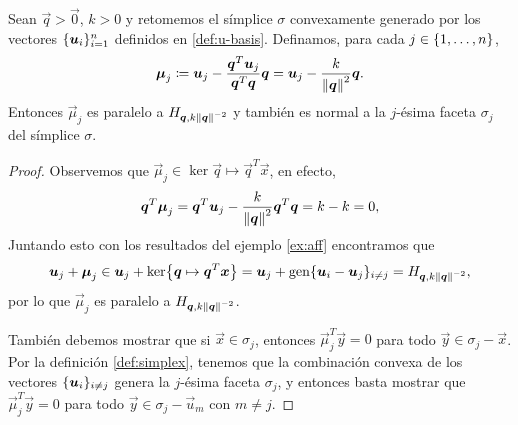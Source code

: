 \begin{lemma}
	\label{mu:orth}
	Sean $\vec{q} > \vec{0}$, $k > 0$ y retomemos el símplice $\sigma$ convexamente generado
	por los vectores $\lbrace \boldsymbol{u}_i \rbrace_{i=1}^{n}$ definidos en
	\eqref{def:u-basis}. Definamos, para cada $j \in \lbrace 1, \ldots, n \rbrace$,
	\begin{equation}
		\label{eq:normal}
		\boldsymbol{\mu}_j \coloneq \boldsymbol{u}_j - \frac{\boldsymbol{q}^T\boldsymbol{u}_j}{\boldsymbol{q}^T\boldsymbol{q}}\boldsymbol{q}
		= \boldsymbol{u}_j - \frac{k}{\left\lVert \boldsymbol{q} \right\rVert^2}\boldsymbol{q}.
	\end{equation}
	Entonces $\vec{\mu}_j$ es paralelo a $H_{\boldsymbol{q}, k\left\lVert \boldsymbol{q} \right\rVert^{-2}}$ y también es
	normal a la $j$-ésima faceta $\sigma_j$ del símplice $\sigma$.
\end{lemma}
\begin{proof}
	Observemos que $\vec{\mu}_j \in \ker{\vec{q} \mapsto \vec{q}^T\vec{x}}$, en efecto,
	\begin{equation*}
		\boldsymbol{q}^T\boldsymbol{\mu}_j = \boldsymbol{q}^T\boldsymbol{u}_j - \frac{k}{\left\lVert \boldsymbol{q} \right\rVert^2}\boldsymbol{q}^T\boldsymbol{q}
		 = k - k = 0,
	\end{equation*}
	Juntando esto con los resultados del ejemplo \ref{ex:aff} encontramos que
	\begin{equation*}
		\boldsymbol{u}_j + \boldsymbol{\mu}_j \in \boldsymbol{u}_j + \mathop{\mathrm{ker}{\left\lbrace \boldsymbol{q} \mapsto \boldsymbol{q}^T\boldsymbol{x} \right\rbrace}} = \boldsymbol{u}_j + \operatorname{gen}\lbrace \boldsymbol{u}_i -
			\boldsymbol{u}_j \rbrace_{i \neq j} = H_{\boldsymbol{q}, k\left\lVert \boldsymbol{q} \right\rVert^{-2}},
	\end{equation*}
	por lo que $\vec{\mu}_j$ es paralelo a $H_{\boldsymbol{q}, k\left\lVert \boldsymbol{q} \right\rVert^{-2}}$.

	También debemos mostrar que si $\vec{x} \in \sigma_j$, entonces
	$\vec{\mu}_j^T\vec{y} = 0$ para todo $\vec{y} \in \sigma_j - \vec{x}$. Por
	la definición \ref{def:simplex}, tenemos que la combinación convexa de  los
	vectores $\lbrace \boldsymbol{u}_i \rbrace_{i \neq j}$ genera la $j$-ésima faceta
	$\sigma_j$, y entonces basta mostrar que $\vec{\mu}_j^T\vec{y} = 0$ para
	todo $\vec{y} \in \sigma_j - \vec{u}_m$ con $m \neq j$.


\end{proof}
